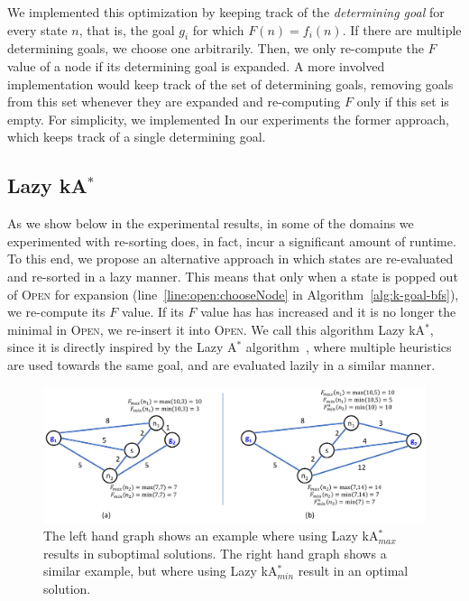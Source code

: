 \documentclass{aicom2e}
\newcommand{\astar}{A$^*$}
\newcommand{\kastar}{kA$^*$}
\newcommand{\kastarmin}{kA$^*_{min}$}
\newcommand{\kastarmax}{kA$^*_{max}$}
\newcommand{\open}{\textsc{Open}}
\begin{document}
We implemented this optimization by keeping track of the {\em determining goal} for every state $n$, 
that is, the goal $g_i$ for which $F(n)=f_i(n)$. If there are multiple determining goals, we choose one arbitrarily. Then, we only re-compute the $F$ value of a node if its determining goal is expanded. A more involved implementation would keep track of the set of determining goals, removing goals from this set whenever they are expanded and re-computing $F$ only if this set is empty. For simplicity, we implemented In our experiments the former approach, which keeps track of a single determining goal.  





\subsection{Lazy \kastar{}}

As we show below in the experimental results, in some of the domains we experimented with re-sorting does, in fact, incur a significant amount of runtime. 
To this end, we propose an alternative approach 
in which states are re-evaluated and re-sorted in a lazy manner. This means
that only when a state is popped out of \open{} for expansion
(line~\ref{line:open:chooseNode} in Algorithm~\ref{alg:k-goal-bfs}), we
re-compute its $F$ value. If its $F$ value has has increased and it is no
longer the minimal in \open, we re-insert it into \open{}. We call this
algorithm Lazy \kastar{}, since it is directly inspired by the Lazy \astar{}
algorithm~\cite{betzalel2015typeSystem,tolpin2013toward}, where multiple
heuristics are used towards the same goal, and are evaluated lazily in a
similar manner.


\begin{figure}
    \includegraphics[width=\textwidth]{Lazy_cropped.pdf}
    \caption{The left hand graph shows an example where using Lazy \kastarmax{}
results in suboptimal solutions. The right hand graph shows a similar example,
but where using Lazy \kastarmin{} result in an optimal solution.}
    \label{fig:lazy}
\end{figure}
\end{document}
